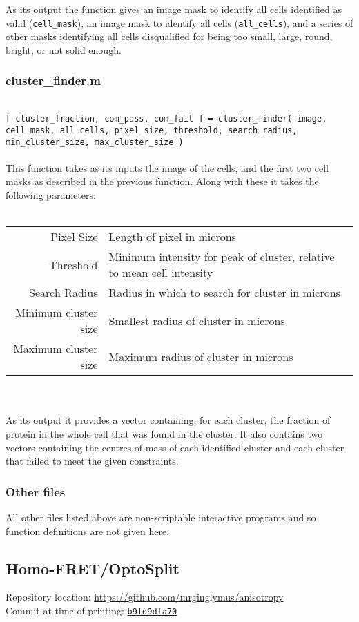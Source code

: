\documentclass[../main.tex]{subfiles}
\begin{document}
As its output the function gives an image mask to identify all cells identified as valid (\texttt{cell\_mask}), an image mask to identify all cells (\texttt{all\_cells}), and a series of other masks identifying all cells disqualified for being too small, large, round, bright, or not solid enough.

\subsubsection{cluster\_finder.m}\ \\
\texttt{[ cluster\_fraction, com\_pass, com\_fail ] = cluster\_finder( image, cell\_mask, all\_cells, pixel\_size, threshold, search\_radius, min\_cluster\_size, max\_cluster\_size ) }
\\\\
This function takes as its inputs the image of the cells, and the first two cell masks as described in the previous function. Along with these it takes the following parameters:
\\\\
\begin{tabular}{rl}
Pixel Size		&	Length of pixel in microns\\
Threshold		&	Minimum intensity for peak of cluster, relative to mean cell intensity\\
Search Radius 	&	Radius in which to search for cluster in microns\\
Minimum cluster size	&	Smallest radius of cluster in microns\\
Maximum cluster size	&	Maximum radius of cluster in microns
\end{tabular}
\\\\
As its output it provides a vector containing, for each cluster, the fraction of protein in the whole cell that was found in the cluster. It also contains two vectors containing the centres of mass of each identified cluster and each cluster that failed to meet the given constraints.

\subsubsection{Other files}
All other files listed above are non-scriptable interactive programs and so function definitions are not given here.


\subsection{Homo-FRET/OptoSplit}
\label{sec:scripts:anisotropy}
Repository location: \url{https://github.com/mrginglymus/anisotropy}\\
Commit at time of printing: \href{https://github.com/mrginglymus/anisotropy/tree/b9fd9dfa704d9a8bd9ffa42c45d398bc92c3b660}{\texttt{b9fd9dfa70}}
\end{document}
